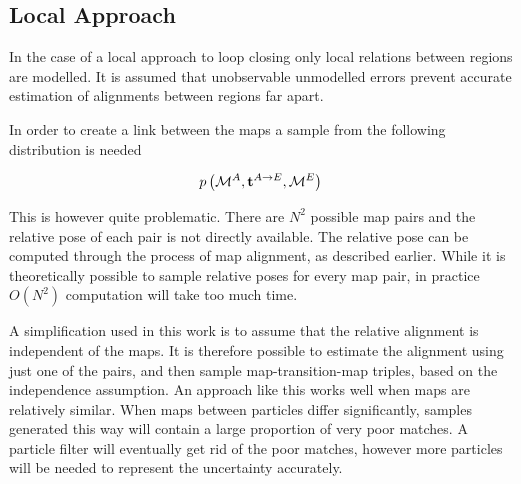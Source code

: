 \subsection{Local Approach}

In the case of a local approach to loop closing only local relations
between regions are modelled. It is assumed that unobservable
unmodelled errors prevent accurate estimation of alignments between
regions far apart.

In order to create a link between the maps a sample from the following
distribution is needed

$$
\prob{\mapA,\tr{}{A}{E},\mapE} 
$$

This is however quite problematic. There are $N^2$ possible map pairs
and the relative pose of each pair is not directly available. The
relative pose can be computed through the process of map alignment, as
described earlier. While it is theoretically possible to sample relative
poses for every map pair, in practice $O(N^2)$ computation will take too
much time.

A simplification used in this work is to assume that the relative
alignment is independent of the maps. It is therefore possible to
estimate the alignment using just one of the pairs, and then sample
map-transition-map triples, based on the independence assumption. An
approach like this works well when maps are relatively similar. When
maps between particles differ significantly, samples generated this way
will contain a large proportion of very poor matches. A particle filter
will eventually get rid of the poor matches, however more particles will
be needed to represent the uncertainty accurately.


